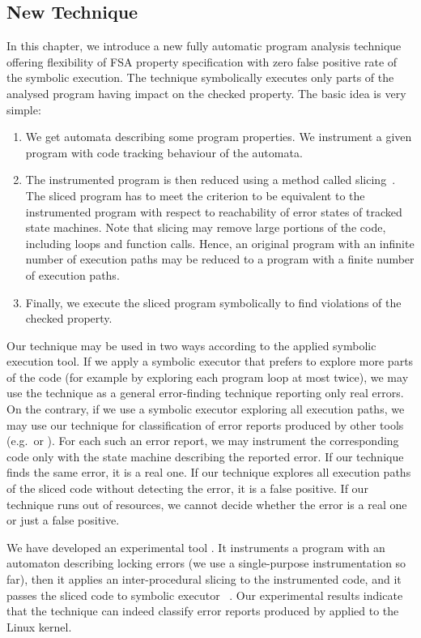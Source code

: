 \subsection*{New Technique}
In this chapter, we introduce a new fully automatic program analysis technique
offering flexibility of FSA property specification with zero false positive
rate of the symbolic execution. The technique symbolically executes only parts
of the analysed program having impact on the checked property. The basic idea
is very simple:
\begin{enumerate}
\item We get automata describing some program properties. We instrument a
  given program with code tracking behaviour of the automata.
\item The instrumented program is then reduced using a method called
  slicing~\cite{slicing}. The sliced program has to meet the criterion
  to be equivalent to the instrumented program with respect to reachability
  of error states of tracked state machines. Note that slicing may remove
  large portions of the code, including loops and function calls. Hence, an
  original program with an infinite number of execution paths may be reduced
  to a program with a finite number of execution paths.
\item Finally, we execute the sliced program symbolically to find violations
  of the checked property.
\end{enumerate}
Our technique may be used in two ways according to the applied symbolic
execution tool. If we apply a symbolic executor that prefers to explore more
parts of the code (for example by exploring each program loop at most twice),
we may use the technique as a general error-finding technique reporting only
real errors.  On the contrary, if we use a symbolic executor exploring all
execution paths, we may use our technique for classification of error reports
produced by other tools (e.g.\ \xgcc or \stan). For each such an error report,
we may instrument the corresponding code only with the state machine
describing the reported error. If our technique finds the same error, it is a
real one.  If our technique explores all execution paths of the sliced code
without detecting the error, it is a false positive. If our technique runs out
of resources, we cannot decide whether the error is a real one or just a false
positive.

We have developed an experimental tool \symbio. It instruments a program with
an automaton describing locking errors (we use a single-purpose
instrumentation so far), then it applies an inter-procedural slicing to the
instrumented code, and it passes the sliced code to symbolic executor
\klee~\cite{klee}. Our experimental results indicate that the
technique can indeed classify error reports produced by \stan applied to the
Linux kernel.

